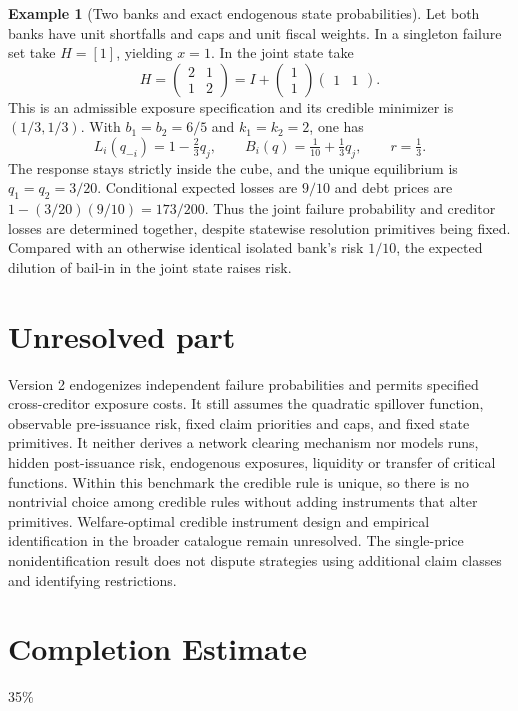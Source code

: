 \documentclass[11pt]{article}
\theoremstyle{definition}
\newtheorem{example}{Example}
\begin{document}
\begin{example}[Two banks and exact endogenous state probabilities]
Let both banks have unit shortfalls and caps and unit fiscal weights. In a
singleton failure set take $H=[1]$, yielding $x=1$. In the joint state take
\[
 H=\begin{pmatrix}2&1\\1&2\end{pmatrix}
       =I+\begin{pmatrix}1\\1\end{pmatrix}\begin{pmatrix}1&1\end{pmatrix}.
\]
This is an admissible exposure specification and its credible minimizer is
$(1/3,1/3)$. With $b_1=b_2=6/5$ and $k_1=k_2=2$, one has
\[
 L_i(q_{-i})=1-\tfrac23q_j,\qquad
 B_i(q)=\tfrac1{10}+\tfrac13q_j,\qquad r=\tfrac13.
\]
The response stays strictly inside the cube, and the unique equilibrium is
$q_1=q_2=3/20$. Conditional expected losses are $9/10$ and debt prices are
$1-(3/20)(9/10)=173/200$. Thus the joint failure probability and creditor
losses are determined together, despite statewise resolution primitives
being fixed. Compared with an otherwise identical isolated bank's risk
$1/10$, the expected dilution of bail-in in the joint state raises risk.
\end{example}

\section*{Unresolved part}
Version 2 endogenizes independent failure probabilities and permits specified
cross-creditor exposure costs. It still assumes the quadratic spillover
function, observable pre-issuance risk, fixed claim priorities and caps, and
fixed state primitives. It neither derives a network clearing mechanism nor
models runs, hidden post-issuance risk, endogenous exposures, liquidity or
transfer of critical functions. Within this benchmark the credible rule is
unique, so there is no nontrivial choice among credible rules without adding
instruments that alter primitives. Welfare-optimal credible instrument design
and empirical identification in the broader catalogue remain unresolved.
The single-price nonidentification result does not dispute strategies using
additional claim classes and identifying restrictions.
\section{Completion Estimate}
35\%
\end{document}
